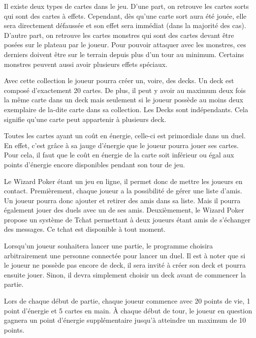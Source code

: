 \documentclass[11pt,a4paper]{article}
\begin{document}
\medbreak

Il existe deux types de cartes dans le jeu. D'une part, on retrouve les cartes sorts qui sont des cartes à effets. Cependant, dès qu'une carte \gls{sort} aura été jouée, elle sera directement défaussée et son effet sera immédiat (dans la majorité des cas). D'autre part, on retrouve les cartes monstres qui sont des cartes devant être posées sur le plateau par le joueur. Pour pouvoir attaquer avec les monstres, ces derniers doivent être sur le terrain depuis plus d'un tour au minimum. Certains monstres peuvent aussi avoir plusieurs effets spéciaux.

\medbreak

Avec cette \gls{collection} le joueur pourra créer un, voire, des \gls{deck}s.  Un \gls{deck} est composé d'exactement 20 cartes.  De plus, il peut y avoir au maximum deux fois la même carte dans un \gls{deck} mais seulement si le joueur possède au moins deux exemplaire de la-dite carte dans sa \gls{collection}.  Les Decks sont indépendants.  Cela signifie qu'une carte peut appartenir à plusieurs deck.

\medbreak

Toutes les cartes ayant un coût en énergie, celle-ci est primordiale dans un duel. En effet, c'est grâce à sa jauge d'énergie que le joueur pourra jouer ses cartes. Pour cela, il faut que le coût en énergie de la carte soit inférieur ou égal aux points d'énergie encore disponibles pendant son tour de jeu.

\medbreak

Le Wizard Poker étant un jeu en ligne, il permet donc de mettre les joueurs en contact. Premièrement, chaque joueur a la possibilité de gérer une liste d'amis. Un joueur pourra donc ajouter et retirer des amis dans sa liste. Mais il pourra également jouer des duels avec un de ses amis. Deuxièmement, le Wizard Poker propose un système de Tchat permettant à deux joueurs étant amis de s'échanger des messages.  Ce tchat est disponible à tout moment. 

\medbreak

Lorsqu'un joueur souhaitera lancer une partie, le programme choisira arbitrairement une personne connectée pour lancer un duel. Il est à noter que si le joueur ne possède pas encore de deck, il sera invité à créer son deck et pourra ensuite jouer. Sinon, il devra simplement choisir un deck avant de commencer la partie.

\medbreak

Lors de chaque début de partie, chaque joueur commence avec 20 points de vie, 1 point d'énergie et 5 cartes en main. À chaque début de tour, le joueur en question gagnera un point d'énergie supplémentaire jusqu'à atteindre un maximum de 10 points. 
\end{document}
